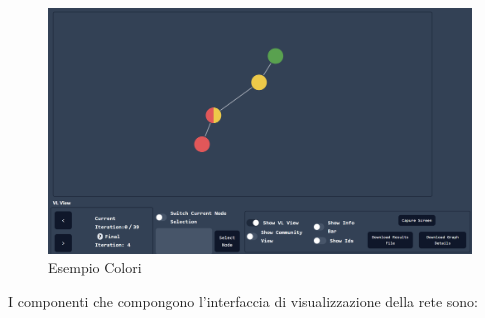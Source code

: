 \documentclass[a4paper,12pt]{report}
\begin{document}
			\begin{center}
			\begin{figure}[H]
			\centering
			\includegraphics[width=0.9\linewidth,keepaspectratio]{colorsexample}	
			\caption{Esempio Colori}
			\end{figure}
			\end{center}
			I componenti che compongono l'interfaccia di visualizzazione della rete sono:
\end{document}
